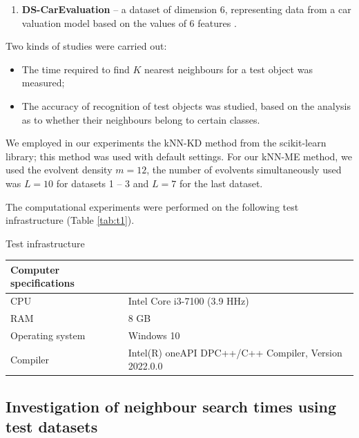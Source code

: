 \documentclass[entropy,article,submit,moreauthors,pdftex]{Definitions/mdpi}
\begin{document}
\begin{paracol}{2}
\begin{enumerate}
\item
\textbf{DS-CarEvaluation} -- a dataset of dimension 6, representing data from a car valuation model based on the values of 6 features \cite{ds-2}.
\end{enumerate}

Two kinds of studies were carried out:
\begin{itemize}
\item The time required to find $K$ nearest neighbours for a test object was measured;
\item The accuracy of recognition of test objects was studied, based on the analysis as to whether their neighbours belong to certain classes.
\end{itemize}

We employed in our experiments the kNN-KD method from the scikit-learn library; this method was used with default settings. For our kNN-ME method, we used the evolvent density $m=12$, the number of evolvents simultaneously used was $L=10$ for datasets 1 -- 3 and $L=7$ for the last dataset.


The computational experiments were performed on the following test infrastructure (Table \ref{tab:t1}).

\begin{specialtable}[H] 
    \caption{Test infrastructure}\label{tab:t1}
	\center
\begin{tabular}{ll}
\toprule
	  Computer specifications & \\
\midrule													
		CPU & Intel Core i3-7100 (3.9 HHz) \\
		RAM & 8 GB \\ 
		Operating system & Windows 10 \\
		Compiler & Intel(R) oneAPI DPC++/C++ Compiler, Version 2022.0.0 \\
\bottomrule
\end{tabular}
\end{specialtable}

\subsection{Investigation of neighbour search times using test datasets}


\end{paracol}
\end{document}
